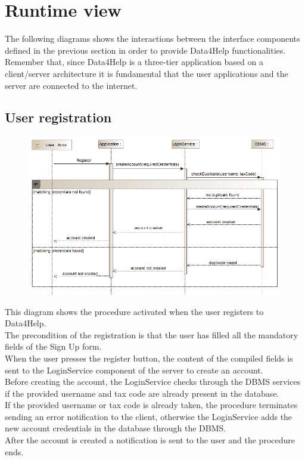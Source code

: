 \section{Runtime view}
The following diagrams shows the interactions between the interface components defined in the previous section in  order to provide Data4Help functionalities. Remember that, since Data4Help is a three-tier application based on a client/server architecture it is fundamental that the user applications and the server are connected to the internet.
\subsection{User registration}
\begin{figure}[H]
\centering
\includegraphics[width=\linewidth]{resources/uml/sequence/Registration.png}
\end{figure}
This diagram shows the procedure activated when the user registers to Data4Help.\\
The precondition of the registration is that the user has filled all the mandatory fields of the Sign Up form.\\
When the user presses the register button, the content of the compiled fields is sent to the LoginService component of the server to create an account.\\
Before creating the account, the LoginService checks through the DBMS services if the provided username and tax code are already present in the database.\\
If the provided username or tax code is already taken, the procedure terminates sending an error notification to the client, otherwise the LoginService adds the new account credentials in the database through the DBMS.\\
After the account is created a notification is sent to the user and the procedure ends.


